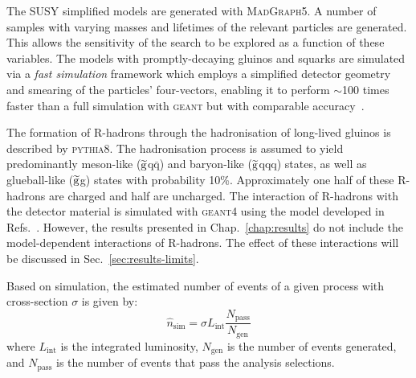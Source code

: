 The SUSY %
simplified models are generated with \textsc{MadGraph5}. A number of samples 
with varying masses and lifetimes of the relevant particles are generated. 
This allows the sensitivity of the search to be explored as a function of 
these variables.
The models with promptly-decaying gluinos and squarks are simulated via a 
\textit{fast simulation} framework which employs a simplified detector geometry 
and smearing of the particles' four-vectors, enabling it to perform $\sim$100 
times faster than a full simulation with \textsc{geant} but with comparable 
accuracy~\cite{fastsim}.


The formation of R-hadrons through the hadronisation of long-lived gluinos is 
described by 
\textsc{pythia8}. The hadronisation process is assumed to yield predominantly 
meson-like ($\mathrm{\widetilde{g}}$q$\bar{\mathrm q}$) and baryon-like ($\mathrm{\widetilde{g}}$qqq) states, 
as well as glueball-like ($\mathrm{\widetilde{g}}$g) states with probability 10\%. 
Approximately one half of these R-hadrons are charged and half are uncharged. 
The interaction of R-hadrons with the detector material is simulated with 
\textsc{geant4} using the model developed in 
Refs.~\cite{cloudmodel1,cloudmodel2}. 
However, the results presented in Chap.~\ref{chap:results} do not include the 
model-dependent interactions of R-hadrons. The effect of these interactions 
will be discussed in Sec.~\ref{sec:results-limits}.


Based on simulation, the estimated number of events of a given process with 
cross-section $\sigma$ is given by:
\begin{equation}
\hat{n}_\mathrm{sim} = \sigma L_\mathrm{int} 
\frac{N_{\mathrm{pass}}}{N_{\mathrm{gen}}}
\end{equation}
where $L_\mathrm{int}$ is the integrated luminosity, $N_{\mathrm{gen}}$ is the 
number of events generated, and $N_{\mathrm{pass}}$ is the number of events 
that pass the analysis selections.



